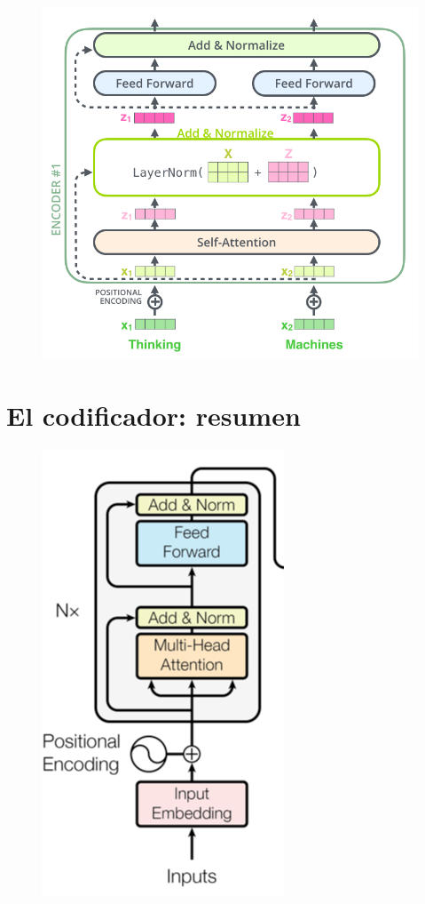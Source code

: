 \begin{itemize}
\begin{figure}[h]
  \centering
  \includegraphics[scale=0.3]{pics/transformer_resideual_layer_norm_2.png}
\end{figure}

\end{itemize}


\section{El codificador: resumen}

\begin{figure}[h]
  \centering
  \includegraphics[scale=0.39]{pics/transformerencoder.png}
\end{figure}

